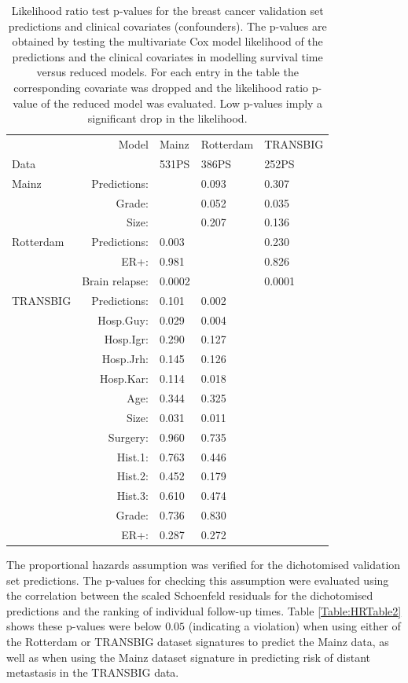 \documentclass[letterpaper,12pt]{article}
\begin{document}

\begin{table}[h]
\centering
\caption{Likelihood ratio test p-values for the breast cancer validation set predictions and clinical covariates (confounders). The p-values are obtained by testing the multivariate Cox model likelihood of the predictions and the clinical covariates in modelling survival time versus reduced models. For each entry in the table the corresponding covariate was dropped and the likelihood ratio p-value of the reduced model was evaluated. Low p-values imply a significant drop in the likelihood.}
\label{Table:ValIndep2}
\begin{small}
    \begin{tabular}{ | l r | l | l | l |} 
    \hline
     & Model & Mainz & Rotterdam & TRANSBIG \\ Data & & 531PS & 386PS & 252PS \\\hline \hline
    Mainz & Predictions:& & 0.093& 0.307\\ &Grade: & & 0.052& 0.035\\ &Size:& & 0.207& 0.136\\\hline
		Rotterdam  & Predictions:& 0.003& & 0.230\\ &ER+: & 0.981& & 0.826\\ &Brain relapse: & 0.0002& & 0.0001\\\hline
		TRANSBIG  & Predictions:& 0.101& 0.002& \\ & Hosp.Guy: & 0.029& 0.004& \\ & Hosp.Igr: & 0.290& 0.127& \\ & Hosp.Jrh: & 0.145& 0.126& \\ & Hosp.Kar: & 0.114& 0.018& \\ & Age:& 0.344& 0.325& \\ & Size: & 0.031& 0.011& \\ & Surgery: & 0.960& 0.735& \\ & Hist.1: & 0.763& 0.446& \\ & Hist.2: & 0.452& 0.179& \\ & Hist.3: & 0.610& 0.474& \\ & Grade:& 0.736& 0.830& \\ &ER+:& 0.287 & 0.272& \\ \hline
    \end{tabular}
\end{small}
\end{table}


The proportional hazards assumption was verified for the dichotomised validation set predictions. The p-values for checking this assumption were evaluated using the correlation between the scaled Schoenfeld residuals for the dichotomised predictions and the ranking of individual follow-up times. Table \ref{Table:HRTable2} shows these p-values were below $0.05$ (indicating a violation) when using either of the Rotterdam or TRANSBIG dataset signatures to predict the Mainz data, as well as when using the Mainz dataset signature in predicting risk of distant metastasis in the TRANSBIG data.
\end{document}
